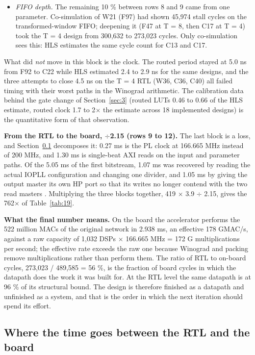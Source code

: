 \begin{itemize}
\item \emph{FIFO depth.} The remaining 10 \% between rows 8 and 9 came from one parameter. Co-simulation of W21 (F97) had shown 45,974 stall cycles on the transformed-window FIFO; deepening it (F47 at T = 8, then C17 at T = 4) took the T = 4 design from 300,632 to 273,023 cycles. Only co-simulation sees this: HLS estimates the same cycle count for C13 and C17.
\end{itemize}

What did \emph{not} move in this block is the clock. The routed period stayed at 5.0 ns from F92 to C22 while HLS estimated 2.4 to 2.9 ns for the same designs, and the three attempts to close 4.5 ns on the T = 4 RTL (W36, C36, C40) all failed timing with their worst paths in the Winograd arithmetic. The calibration data behind the gate change of Section~\ref{sec:3} (routed LUTs 0.46 to 0.66 of the HLS estimate, routed clock 1.7 to 2$\times$ the estimate across 18 implemented designs) is the quantitative form of that observation.

\textbf{From the RTL to the board, $\div$2.15 (rows 9 to 12).} The last block is a loss, and Section~\ref{sec:6.3} decomposes it: 0.27 ms is the PL clock at 166.665 MHz instead of 200 MHz, and 1.30 ms is single-beat AXI reads on the input and parameter paths. Of the 5.05 ms of the first bitstream, 1.07 ms was recovered by reading the actual IOPLL configuration and changing one divider, and 1.05 ms by giving the output master its own HP port so that its writes no longer contend with the two read masters \cite{ref20}. Multiplying the three blocks together, 419 $\times$ 3.9 $\div$ 2.15, gives the 762$\times$ of Table~\ref{tab:19}.

\textbf{What the final number means.} On the board the accelerator performs the 522 million MACs of the original network in 2.938 ms, an effective 178 GMAC/s, against a raw capacity of 1,032 DSPs $\times$ 166.665 MHz = 172 G multiplications per second; the effective rate exceeds the raw one because Winograd and packing remove multiplications rather than perform them. The ratio of RTL to on-board cycles, 273,023 / 489,585 = 56 \%, is the fraction of board cycles in which the datapath does the work it was built for. At the RTL level the same datapath is at 96 \% of its structural bound. The design is therefore finished as a datapath and unfinished as a system, and that is the order in which the next iteration should spend its effort.

\subsection{Where the time goes between the RTL and the board}\label{sec:6.3}

